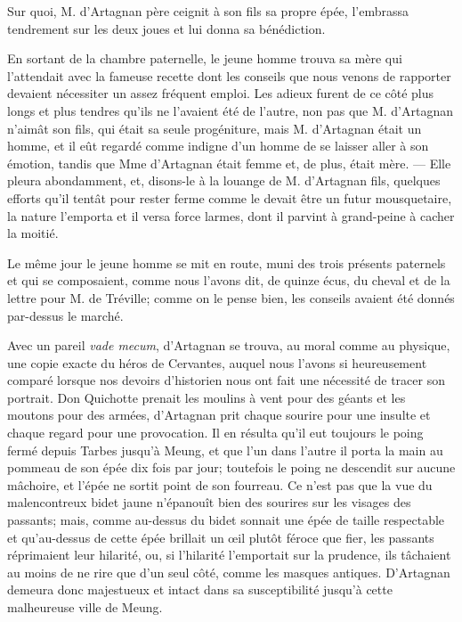 Sur quoi, M. d'Artagnan père ceignit à son fils sa propre épée, l'embrassa tendrement sur les deux joues et lui donna sa bénédiction. 

En sortant de la chambre paternelle, le jeune homme trouva sa mère qui l'attendait avec la fameuse recette dont les conseils que nous venons de rapporter devaient nécessiter un assez fréquent emploi. Les adieux furent de ce côté plus longs et plus tendres qu'ils ne l'avaient été de l'autre, non pas que M. d'Artagnan n'aimât son fils, qui était sa seule progéniture, mais M. d'Artagnan était un homme, et il eût regardé comme indigne d'un homme de se laisser aller à son émotion, tandis que Mme d'Artagnan était femme et, de plus, était mère. --- Elle pleura abondamment, et, disons-le à la louange de M. d'Artagnan fils, quelques efforts qu'il tentât pour rester ferme comme le devait être un futur mousquetaire, la nature l'emporta et il versa force larmes, dont il parvint à grand-peine à cacher la moitié. 

Le même jour le jeune homme se mit en route, muni des trois présents paternels et qui se composaient, comme nous l'avons dit, de quinze écus, du cheval et de la lettre pour M. de Tréville; comme on le pense bien, les conseils avaient été donnés par-dessus le marché. 

Avec un pareil \textit{vade mecum}, d'Artagnan se trouva, au moral comme au physique, une copie exacte du héros de Cervantes, auquel nous l'avons si heureusement comparé lorsque nos devoirs d'historien nous ont fait une nécessité de tracer son portrait. Don Quichotte prenait les moulins à vent pour des géants et les moutons pour des armées, d'Artagnan prit chaque sourire pour une insulte et chaque regard pour une provocation. Il en résulta qu'il eut toujours le poing fermé depuis Tarbes jusqu'à Meung, et que l'un dans l'autre il porta la main au pommeau de son épée dix fois par jour; toutefois le poing ne descendit sur aucune mâchoire, et l'épée ne sortit point de son fourreau. Ce n'est pas que la vue du malencontreux bidet jaune n'épanouît bien des sourires sur les visages des passants; mais, comme au-dessus du bidet sonnait une épée de taille respectable et qu'au-dessus de cette épée brillait un œil plutôt féroce que fier, les passants réprimaient leur hilarité, ou, si l'hilarité l'emportait sur la prudence, ils tâchaient au moins de ne rire que d'un seul côté, comme les masques antiques. D'Artagnan demeura donc majestueux et intact dans sa susceptibilité jusqu'à cette malheureuse ville de Meung. 

